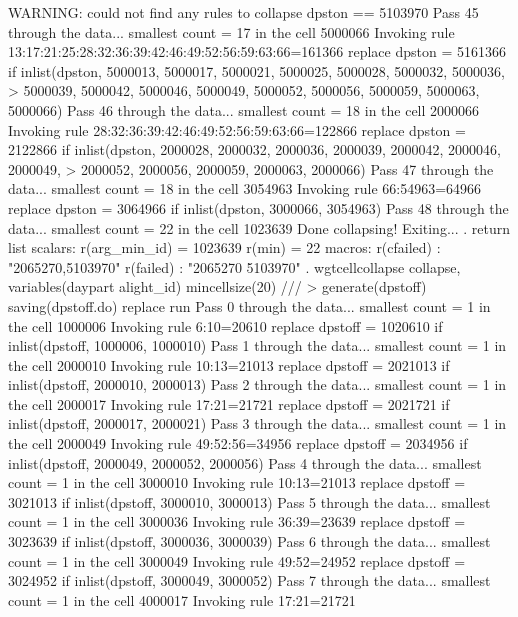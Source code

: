   WARNING: could not find any rules to collapse dpston == 5103970
Pass 45 through the data...
  smallest count = 17 in the cell      5000066
  Invoking rule 13:17:21:25:28:32:36:39:42:46:49:52:56:59:63:66=161366
  replace dpston = 5161366 if inlist(dpston, 5000013, 5000017, 5000021, 5000025, 5000028, 5000032, 5000036,
>  5000039, 5000042, 5000046, 5000049, 5000052, 5000056, 5000059, 5000063, 5000066)
Pass 46 through the data...
  smallest count = 18 in the cell      2000066
  Invoking rule 28:32:36:39:42:46:49:52:56:59:63:66=122866
  replace dpston = 2122866 if inlist(dpston, 2000028, 2000032, 2000036, 2000039, 2000042, 2000046, 2000049,
>  2000052, 2000056, 2000059, 2000063, 2000066)
Pass 47 through the data...
  smallest count = 18 in the cell      3054963
  Invoking rule 66:54963=64966
  replace dpston = 3064966 if inlist(dpston, 3000066, 3054963)
Pass 48 through the data...
  smallest count = 22 in the cell      1023639
  Done collapsing! Exiting...
{\smallskip}
. return list
{\smallskip}
scalars:
         r(arg_min_id) =  1023639
                r(min) =  22
{\smallskip}
macros:
            r(cfailed) : "2065270,5103970"
             r(failed) : "2065270 5103970"
{\smallskip}
. wgtcellcollapse collapse, variables(daypart alight_id) mincellsize(20) ///
>         generate(dpstoff) saving(dpstoff.do) replace run
Pass 0 through the data...
  smallest count = 1 in the cell      1000006
  Invoking rule 6:10=20610
  replace dpstoff = 1020610 if inlist(dpstoff, 1000006, 1000010)
Pass 1 through the data...
  smallest count = 1 in the cell      2000010
  Invoking rule 10:13=21013
  replace dpstoff = 2021013 if inlist(dpstoff, 2000010, 2000013)
Pass 2 through the data...
  smallest count = 1 in the cell      2000017
  Invoking rule 17:21=21721
  replace dpstoff = 2021721 if inlist(dpstoff, 2000017, 2000021)
Pass 3 through the data...
  smallest count = 1 in the cell      2000049
  Invoking rule 49:52:56=34956
  replace dpstoff = 2034956 if inlist(dpstoff, 2000049, 2000052, 2000056)
Pass 4 through the data...
  smallest count = 1 in the cell      3000010
  Invoking rule 10:13=21013
  replace dpstoff = 3021013 if inlist(dpstoff, 3000010, 3000013)
Pass 5 through the data...
  smallest count = 1 in the cell      3000036
  Invoking rule 36:39=23639
  replace dpstoff = 3023639 if inlist(dpstoff, 3000036, 3000039)
Pass 6 through the data...
  smallest count = 1 in the cell      3000049
  Invoking rule 49:52=24952
  replace dpstoff = 3024952 if inlist(dpstoff, 3000049, 3000052)
Pass 7 through the data...
  smallest count = 1 in the cell      4000017
  Invoking rule 17:21=21721
